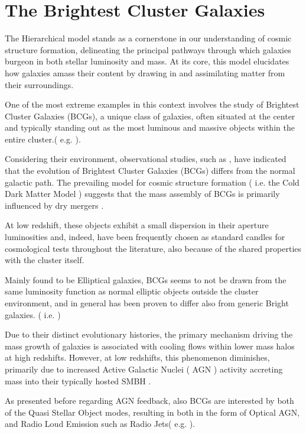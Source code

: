 \newpage
\section{The Brightest Cluster Galaxies }
The Hierarchical model stands as a cornerstone in our understanding of cosmic structure formation, delineating the principal pathways through which galaxies burgeon in both stellar luminosity and mass. At its core, this model elucidates how galaxies amass their content by drawing in and assimilating matter from their surroundings.

One of the most extreme examples in this context involves the study of Brightest Cluster Galaxies (BCGs), a unique class of galaxies, often situated at the center and typically standing out as the most luminous and massive objects within the entire cluster.( e.g. \cite{2015MNRAS.448....2W} ).

Considering their environment, observational studies, such as \cite{2020MNRAS.498.2719T}, have indicated that the evolution of Brightest Cluster Galaxies (BCGs) differs from the normal galactic path. The prevailing model for cosmic structure formation ( i.e. the Cold Dark Matter Model ) suggests that the mass assembly of BCGs is primarily influenced by dry mergers \cite{2007MNRAS.375....2D, 2019ApJ...881..150C}.

At low redshift, these objects exhibit a small dispersion in their aperture luminosities and, indeed, have been frequently chosen as standard candles for cosmological tests throughout the literature, also because of the shared properties with the cluster itself.

Mainly found to be Elliptical galaxies, BCGs seems to not be drawn from the same luminosity function as normal elliptic objects outside the cluster environment, and in general has been proven to differ also from generic Bright galaxies.
 ( i.e. \cite{1977ApJ...212..311T}) 
  
Due to their distinct evolutionary histories, the primary mechanism driving the mass growth of galaxies is associated with cooling flows within lower mass halos at high redshifts. However, at low redshifts, this phenomenon diminishes, primarily due to increased Active Galactic Nuclei ( AGN ) activity accreting mass into their typically hosted SMBH \cite{2006ApJ...652..216R}.
 
As presented before regarding AGN feedback, also BCGs are interested by both of the Quasi Stellar Object modes, resulting in both in the form of Optical AGN, and Radio Loud Emission such as Radio Jets( e.g. \cite{2007MNRAS.379..867V} ).

